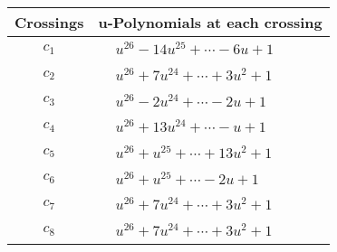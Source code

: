 \documentclass[1p]{elsarticle_modified}
\theoremstyle{definition}
\begin{document}
\begin{tabular}{m{50pt}|m{274pt}}
Crossings & \hspace{64pt}u-Polynomials at each crossing \\
\hline $$\begin{aligned}c_{1}\end{aligned}$$&$\begin{aligned}
&u^{26}-14 u^{25}+\cdots-6 u+1
\end{aligned}$\\
\hline $$\begin{aligned}c_{2}\end{aligned}$$&$\begin{aligned}
&u^{26}+7 u^{24}+\cdots+3 u^2+1
\end{aligned}$\\
\hline $$\begin{aligned}c_{3}\end{aligned}$$&$\begin{aligned}
&u^{26}-2 u^{24}+\cdots-2 u+1
\end{aligned}$\\
\hline $$\begin{aligned}c_{4}\end{aligned}$$&$\begin{aligned}
&u^{26}+13 u^{24}+\cdots- u+1
\end{aligned}$\\
\hline $$\begin{aligned}c_{5}\end{aligned}$$&$\begin{aligned}
&u^{26}+u^{25}+\cdots+13 u^2+1
\end{aligned}$\\
\hline $$\begin{aligned}c_{6}\end{aligned}$$&$\begin{aligned}
&u^{26}+u^{25}+\cdots-2 u+1
\end{aligned}$\\
\hline $$\begin{aligned}c_{7}\end{aligned}$$&$\begin{aligned}
&u^{26}+7 u^{24}+\cdots+3 u^2+1
\end{aligned}$\\
\hline $$\begin{aligned}c_{8}\end{aligned}$$&$\begin{aligned}
&u^{26}+7 u^{24}+\cdots+3 u^2+1
\end{aligned}$\\

\end{tabular}
\end{document}
